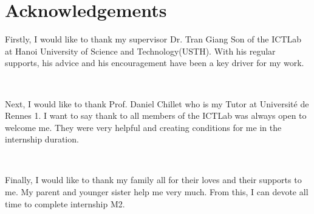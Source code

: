 \chapter*{Acknowledgements}

Firstly, I would like to thank my supervisor Dr. Tran Giang Son of the ICTLab at Hanoi University of Science and Technology(USTH). With his regular supports, his advice and his encouragement have been a key driver for my work.  

\

Next, I would like to thank Prof. Daniel Chillet who is my Tutor at Université de Rennes 1. I want to say thank to all members of the ICTLab  was always open to welcome me. They were very helpful and creating conditions for me in the internship duration.

\

Finally, I would like to thank my family all for their loves and their supports to me. My parent and younger sister help me very much. From this, I can devote all time to complete internship M2.
